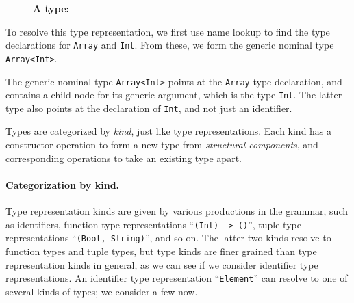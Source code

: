 \documentclass[../generics]{subfiles}
\begin{document}
\medskip

\begin{figure}
\begin{center}
\textbf{A type:}
\end{center}
\end{figure}

To resolve this type representation, we first use name lookup to find the type declarations for \texttt{Array} and \texttt{Int}. From these, we form the generic nominal type \texttt{Array<Int>}.

The generic nominal type \texttt{Array<Int>} points at the \texttt{Array} type declaration, and contains a child node for its generic argument, which is the type \texttt{Int}. The latter type also points at the declaration of \texttt{Int}, and not just an identifier.

Types are categorized by \emph{kind}, just like type representations. Each kind has a constructor operation to form a new type from \emph{structural components}, and corresponding operations to take an existing type apart.

\paragraph{Categorization by kind.}
Type representation kinds are given by various productions in the grammar, such as identifiers, function type representations ``\texttt{(Int) -> ()}'', tuple type representations ``\texttt{(Bool, String)}'', and so on. The latter two kinds resolve to function types and tuple types, but type kinds are finer grained than type representation kinds in general, as we can see if we consider identifier type representations. An identifier type representation ``\texttt{Element}'' can resolve to one of several kinds of types; we consider a few now.
\end{document}
